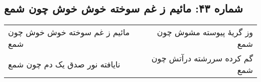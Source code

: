 \begin{center}
\section*{شماره ۴۳: مائیم ز غم سوخته خوش خوش چون شمع}
\label{sec:043}
\begin{longtable}{l p{0.5cm} r}
مائیم ز غم سوخته خوش خوش چون شمع
&&
وز گریهٔ پیوسته مشوش چون شمع
\\
نایافته نور صدق یک دم چون شمع
&&
گم کرده سررشته درآتش چون شمع
\\
\end{longtable}
\end{center}
